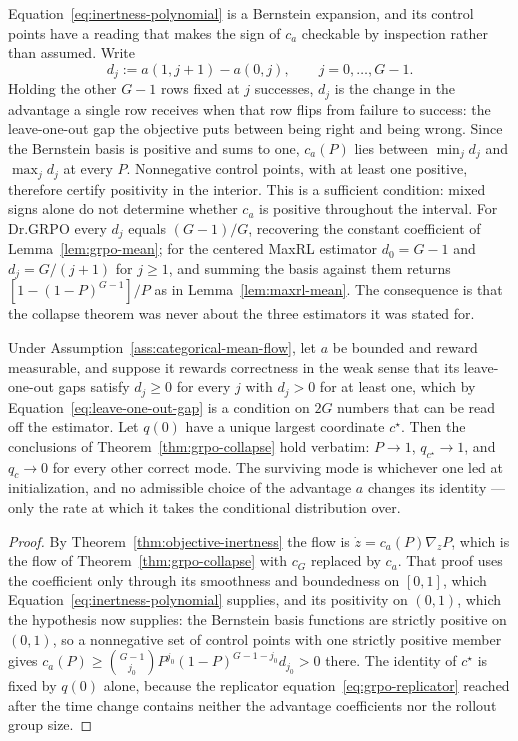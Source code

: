 Equation~\eqref{eq:inertness-polynomial} is a Bernstein expansion, and its
control points have a reading that makes the sign of $c_a$ checkable by
inspection rather than assumed. Write
\begin{equation}
 d_j:=a(1,j+1)-a(0,j),\qquad j=0,\ldots,G-1 .
 \label{eq:leave-one-out-gap}
\end{equation}
Holding the other $G-1$ rows fixed at $j$ successes, $d_j$ is the change in the
advantage a single row receives when that row flips from failure to success:
the leave-one-out gap the objective puts between being right and being wrong.
Since the Bernstein basis is positive and sums to one, $c_a(P)$ lies between
$\min_jd_j$ and $\max_jd_j$ at every $P$. Nonnegative control points,
with at least one positive, therefore certify positivity in the interior.
This is a sufficient condition: mixed signs alone do not determine whether
$c_a$ is positive throughout the interval.
For Dr.GRPO every $d_j$ equals $(G-1)/G$, recovering the constant coefficient
of Lemma~\ref{lem:grpo-mean}; for the centered MaxRL estimator $d_0=G-1$ and
$d_j=G/(j+1)$ for $j\ge1$, and summing the basis against them returns
$[1-(1-P)^{G-1}]/P$ as in Lemma~\ref{lem:maxrl-mean}. The consequence is that
the collapse theorem was never about the three estimators it was stated for.

\begin{corollary}
\enforcehalffinalproseline
\label{cor:class-collapse}
Under Assumption~\ref{ass:categorical-mean-flow}, let $a$ be bounded and
reward measurable, and suppose it rewards correctness in the weak sense that
its leave-one-out gaps satisfy $d_j\ge0$ for every $j$ with $d_j>0$ for at
least one, which by Equation~\eqref{eq:leave-one-out-gap} is a condition on
$2G$ numbers that can be read off the estimator. Let $q(0)$ have a unique
largest coordinate $c^\star$. Then the conclusions of Theorem~\ref{thm:grpo-collapse}
hold verbatim: $P\to1$, $q_{c^\star}\to1$, and $q_c\to0$ for every other
correct mode. The surviving mode is whichever one led at initialization, and
no admissible choice of the advantage $a$ changes its identity --- only the
rate at which it takes the conditional distribution over.
\end{corollary}

\begin{proof}
\enforcehalffinalproseline
By Theorem~\ref{thm:objective-inertness} the flow is
$\dot z=c_a(P)\nabla_zP$, which is the flow of
Theorem~\ref{thm:grpo-collapse} with $c_G$ replaced by $c_a$. That proof uses
the coefficient only through its smoothness and boundedness on $[0,1]$, which
Equation~\eqref{eq:inertness-polynomial} supplies, and its positivity on
$(0,1)$, which the hypothesis now supplies: the Bernstein basis functions are
strictly positive on $(0,1)$, so a nonnegative set of control points with one
strictly positive member gives $c_a(P)\ge\binom{G-1}{j_0}P^{j_0}(1-P)^{G-1-j_0}
d_{j_0}>0$ there. The identity of $c^\star$ is fixed by $q(0)$ alone, because
the replicator equation~\eqref{eq:grpo-replicator} reached after the time
change contains neither the advantage coefficients nor the rollout group size.
\end{proof}


